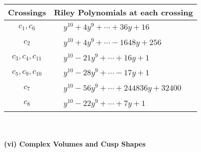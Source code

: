 \documentclass[1p]{elsarticle_modified}
\theoremstyle{definition}
\begin{document}
\begin{tabular}{m{50pt}|m{274pt}}
Crossings & \hspace{64pt}Riley Polynomials at each crossing \\
\hline $$\begin{aligned}c_{1},c_{6}\end{aligned}$$&$\begin{aligned}
&y^{10}+4 y^9+\cdots+36 y+16
\end{aligned}$\\
\hline $$\begin{aligned}c_{2}\end{aligned}$$&$\begin{aligned}
&y^{10}+4 y^9+\cdots-1648 y+256
\end{aligned}$\\
\hline $$\begin{aligned}c_{3},c_{4},c_{11}\end{aligned}$$&$\begin{aligned}
&y^{10}-21 y^9+\cdots+16 y+1
\end{aligned}$\\
\hline $$\begin{aligned}c_{5},c_{9},c_{10}\end{aligned}$$&$\begin{aligned}
&y^{10}-28 y^9+\cdots-17 y+1
\end{aligned}$\\
\hline $$\begin{aligned}c_{7}\end{aligned}$$&$\begin{aligned}
&y^{10}-56 y^9+\cdots+244836 y+32400
\end{aligned}$\\
\hline $$\begin{aligned}c_{8}\end{aligned}$$&$\begin{aligned}
&y^{10}-22 y^9+\cdots+7 y+1
\end{aligned}$\\
\hline
\end{tabular}\\~\\
\newpage\flushleft \textbf{(vi) Complex Volumes and Cusp Shapes}
\end{document}
